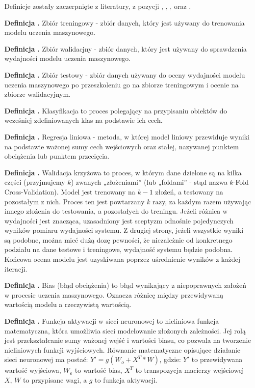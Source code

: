 Definicje zostały zaczerpnięte z literatury, z pozycji \cite{Fenner2020}, \cite{Geron2020},
\cite{Seenappa} , \cite{Goodfellow2016} oraz \cite{vanDerMaaten}.

\noindent
\textbf{Definicja .}
\incrementdefinitionIndex
Zbiór treningowy - zbiór danych, który jest używany do trenowania modelu uczenia maszynowego.

\noindent
\textbf{Definicja .}
\incrementdefinitionIndex
Zbiór walidacjny - zbiór danych, który jest używany do sprawdzenia wydajności modelu uczenia maszynowego.

\noindent
\textbf{Definicja .}
\incrementdefinitionIndex
Zbiór testowy - zbiór danych używany do oceny wydajności modelu uczenia maszynowego
po przeszkoleniu go na zbiorze treningowym i ocenie na zbiorze walidacyjnym.

\noindent
\textbf{Definicja .}
\incrementdefinitionIndex
Klasyfikacja to proces polegający na przypisaniu obiektów do wcześniej zdefiniowanych klas na podstawie ich cech.

\noindent
\textbf{Definicja .}
\incrementdefinitionIndex
Regresja liniowa - metoda, w której model liniowy przewiduje wyniki na podstawie ważonej sumy cech wejściowych oraz stałej,
nazywanej punktem obciążenia lub punktem przecięcia.

\noindent
\textbf{Definicja .}
\incrementdefinitionIndex
Walidacja krzyżowa to proces, w którym dane dzielone są na kilka części (przyjmujemy $k$) zwanych „złożeniami”
(lub „foldami” - stąd nazwa $k$-Fold Cross-Validation). Model jest trenowany na $k-1$ złożeń, a testowany na pozostałym z nich.
Proces ten jest powtarzany $k$ razy, za każdym razem używając innego złożenia do testowania, a pozostałych do treningu.
Jeżeli różnica w wydajności jest znacząca, uzasadniony jest sceptyzm odnośnie pojedynczych wyników pomiaru wydajności systemu.
Z drugiej strony, jeżeli wszystkie wyniki są podobne, można mieć dużą dozę pewności, że niezależnie od konkretnego podziału
na dane testowe i treningowe, wydajność systemu będzie podobna.
Końcowa ocena modelu jest uzyskiwana poprzez uśrednienie wyników z każdej iteracji.

\noindent
\textbf{Definicja .}
\incrementdefinitionIndex
Bias (błąd obciążenia) to błąd wynikający z niepoprawnych założeń w procesie uczenia maszynowego.
Oznacza różnicę między przewidywaną wartością modelu a rzeczywistą wartością.

\noindent
\textbf{Definicja .}
\incrementdefinitionIndex
Funkcja aktywacji w sieci neuronowej to nieliniowa funkcja matematyczna,
która umożliwia sieci modelowanie złożonych zależności.
Jej rolą jest przekształcanie sumy ważonej wejść i wartości biasu,
co pozwala na tworzenie nieliniowych funkcji wyjściowych.
Równanie matematyczne opisujące działanie sieci neuronowej ma postać: $Y' = g(W_o + X^T * W)$, gdzie:
$Y'$ to przewidywana wartość wyjściowa,
$W_o$ to wartość bias,
$X^T$ to transpozycja macierzy wejściowej $X$,
$W$ to przypisane wagi,
a $g$ to funkcja aktywacji.

